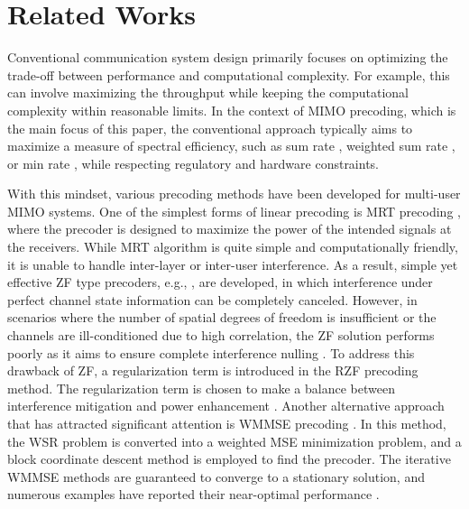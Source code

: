 \section{Related Works}
Conventional communication system design primarily focuses on optimizing the trade-off between performance and computational complexity. For example, this can involve maximizing the throughput while keeping the computational complexity within reasonable limits. In the context of MIMO precoding, which is the main focus of this paper, the conventional approach typically aims to maximize a measure of spectral efficiency, such as sum rate \cite{Foad2016Hybrid}, weighted sum rate \cite{shi2011iteratively}, or min rate \cite{Manijeh2019maxmin}, while respecting regulatory and hardware constraints.


With this mindset, various precoding methods have been developed for multi-user MIMO systems. One of the simplest forms of linear precoding is MRT precoding \cite{Lo_1999_MRT}, where the precoder is designed to maximize the power of the intended signals at the receivers. While MRT algorithm is quite simple and computationally friendly, it is unable to handle inter-layer or inter-user interference. As a result, simple yet effective ZF type precoders, e.g., \cite{Hong_2013_ZF,Cornelis2023WSRZF}, are developed, in which interference under perfect channel state information can be completely canceled. However, in scenarios where the number of spatial degrees of freedom is insufficient or the channels are ill-conditioned due to high correlation, the ZF solution performs poorly as it aims to ensure complete interference nulling \cite{Peel2005RZF}. To address this drawback of ZF, a regularization term is introduced in the RZF precoding method. The regularization term is chosen to make a balance between interference mitigation and power enhancement \cite{Emil_RZF_2014,Peel2005RZF}. Another alternative approach that has attracted significant attention is WMMSE precoding \cite{shi2011iteratively}. In this method, the WSR problem is converted into a weighted MSE minimization problem, and a block coordinate descent method is employed to find the precoder. The iterative WMMSE methods are guaranteed to converge to a stationary solution, and numerous examples have reported their near-optimal performance \cite{Juseong2024AnalogFeed}.


